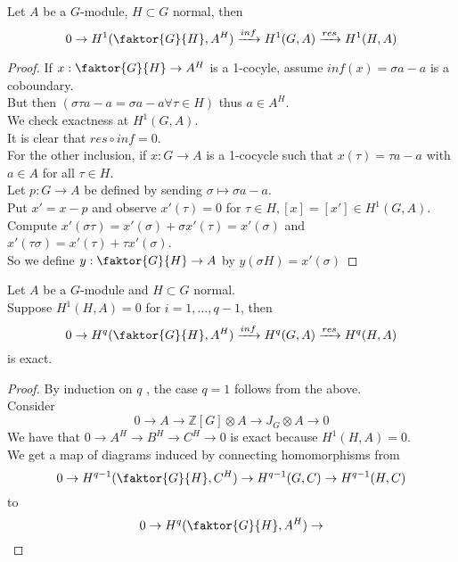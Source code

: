 \documentclass[../main.tex]{subfiles}
\begin{document}
\begin{thm}
	Let $A$ be a $G$-module, $H \subset G$ normal, then
	\[ 
		0\to H^{1}( \faktor{G}{H},A^{H}) \xto{inf} H^{1}( G,A) \xto{res} H^{1}( H,A) 
	\]
	
\end{thm}
\begin{proof}
If $x: \faktor{G}{H}\to A^{H}$ is a 1-cocyle, assume $inf( x) =\sigma a -a$  is a coboundary.\\
But then $( \sigma\tau a -a = \sigma a -a\forall \tau \in H) $ thus $a\in A^{H}$.\\
We check exactness at $H^{1}( G,A) $.\\
It is clear that $res \circ inf=0$.\\
For the other inclusion, if $x:G\to A$ is a 1-cocycle such that $x( \tau) = \tau a -a$ with $a\in A$ for all $\tau \in H$.\\
Let $p:G\to A$ be defined by sending $\sigma\mapsto \sigma a - a $.\\
Put $x'=x-p$ and observe $x'( \tau) =0$ for $\tau \in H, [ x] = [ x'] \in H^{1}( G,A) $.\\
Compute $x'( \sigma\tau) = x'( \sigma) + \sigma x'( \tau) = x'( \sigma)  $ and $x'( \tau\sigma) = x'( \tau) + \tau x'( \sigma) $.\\
So we define $y: \faktor{G}{H}\to A$ by $y( \sigma H) = x'( \sigma) $  
\end{proof}
\begin{thm}
	Let $A$ be a  $G$-module and $H \subset G$ normal.\\
	Suppose $H^{1}( H,A) =0$ for $i=1,\ldots,q-1$, then
	\[ 
		0\to H^{q}( \faktor{G}{H},A^{H}) \xto{inf} H^{q}( G,A) \xto{res} H^{q}( H,A)  
	\]
	is exact.
\end{thm}
\begin{proof}
By induction on $q$ , the case $q=1$ follows from the above.\\
Consider
\[ 
	0\to A \to \mathbb{Z}[G]\otimes A \to J_G\otimes A \to 0
\]
We have that $0\to A^{H}\to B^{H}\to C^{H}\to 0$ is exact because $H^{1}( H,A) =0$.\\
We get a map of diagrams induced by connecting homomorphisms from
\[ 
0\to H^{q-1}(  \faktor{G}{H}, C^{H}) \to H^{q-1}( G,C) \to H^{q-1}( H,C)  
\]
to
\[ 
0 \to H^{q}(  \faktor{G}{H}, A^{H})\to  
\]



\end{proof}

	
\end{document}
